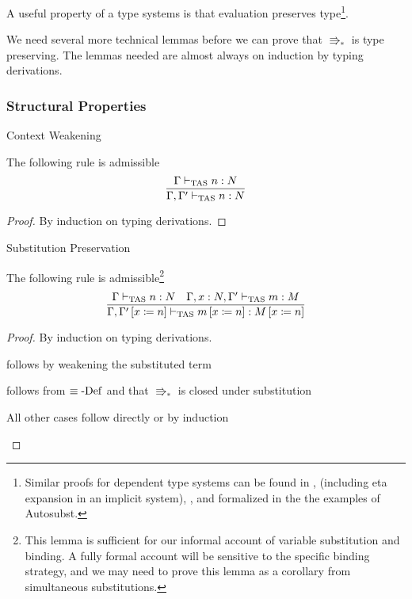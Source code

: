 A useful property of a type systems is that evaluation preserves type\footnote{
  Similar proofs for dependent type systems can be found in \cite[Chapter 3]{luo1994computation}, \cite[Section 3.1]{10.1007/3-540-45413-6_27}(including eta expansion in an implicit system), \cite[appendix]{sjoberg2012irrelevance}, and formalized in the the examples of Autosubst\cite{SchaeferEtAl:2015:Autosubst:-Reasoning}.
  }.
 
We need several more technical lemmas before we can prove that $\Rrightarrow_{\ast}$ is type preserving.
The lemmas needed are almost always on induction by typing derivations.
 
\subsubsection{Structural Properties}
 
\begin{thm}
Context Weakening
 
The following rule is admissible
\[
\frac{\Gamma\vdash_{\mathrm{TAS}} n:N}{\Gamma,\Gamma'\vdash_{\mathrm{TAS}} n:N}
\]
\end{thm}
 
\begin{proof}
By induction on typing derivations.
\end{proof}
\begin{lem}
Substitution Preservation
 
The following rule is admissible\footnote{
 This lemma is sufficient for our informal account of variable substitution and binding.
 A fully formal account will be sensitive to the specific binding strategy, and we may need to prove this lemma as a corollary from simultaneous substitutions.
}
\[
\frac{\Gamma\vdash_{\mathrm{TAS}} n:N\quad\Gamma,x:N,\Gamma'\vdash_{\mathrm{TAS}} m:M}{\Gamma,\Gamma'\left[x\coloneqq n\right]\vdash_{\mathrm{TAS}} m\left[x\coloneqq n\right]:M\left[x\coloneqq n\right]}
\]
\end{lem}
 
\begin{proof}
By induction on typing derivations.
 
\begin{casenv}
 \item {} follows by weakening the substituted term
 \item {} follows from $\equiv\operatorname{-Def}$ and that $\Rrightarrow_{\ast}$ is closed under substitution
 \item All other cases follow directly or by induction
\end{casenv}
\end{proof}

